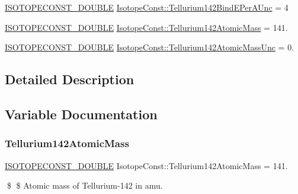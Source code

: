 \begin{DoxyCompactItemize}
\mbox{\hyperlink{group___isotope_const-_macros_ga8f45a7272ce02c0b4c65c44636ed719a}{I\+S\+O\+T\+O\+P\+E\+C\+O\+N\+S\+T\+\_\+\+D\+O\+U\+B\+LE}} \mbox{\hyperlink{group___isotope_const-_tellurium-_te142_ga7dc6b8a4dc039143e81bc5b7ece02100}{Isotope\+Const\+::\+Tellurium142\+Bind\+E\+Per\+A\+Unc}} = 4
\item 
\mbox{\hyperlink{group___isotope_const-_macros_ga8f45a7272ce02c0b4c65c44636ed719a}{I\+S\+O\+T\+O\+P\+E\+C\+O\+N\+S\+T\+\_\+\+D\+O\+U\+B\+LE}} \mbox{\hyperlink{group___isotope_const-_tellurium-_te142_gacf8e739105b6c87a92651ec634b64623}{Isotope\+Const\+::\+Tellurium142\+Atomic\+Mass}} = 141.
\item 
\mbox{\hyperlink{group___isotope_const-_macros_ga8f45a7272ce02c0b4c65c44636ed719a}{I\+S\+O\+T\+O\+P\+E\+C\+O\+N\+S\+T\+\_\+\+D\+O\+U\+B\+LE}} \mbox{\hyperlink{group___isotope_const-_tellurium-_te142_gaa2918a37adb684ac71efa4787174badf}{Isotope\+Const\+::\+Tellurium142\+Atomic\+Mass\+Unc}} = 0.
\end{DoxyCompactItemize}


\subsection{Detailed Description}


\subsection{Variable Documentation}
\mbox{\label{group___isotope_const-_tellurium-_te142_gacf8e739105b6c87a92651ec634b64623}} 
\subsubsection{\texorpdfstring{Tellurium142\+Atomic\+Mass}{Tellurium142AtomicMass}}
{\footnotesize\ttfamily \mbox{\hyperlink{group___isotope_const-_macros_ga8f45a7272ce02c0b4c65c44636ed719a}{I\+S\+O\+T\+O\+P\+E\+C\+O\+N\+S\+T\+\_\+\+D\+O\+U\+B\+LE}} Isotope\+Const\+::\+Tellurium142\+Atomic\+Mass = 141.}

\$ \$ Atomic mass of Tellurium-\/142 in amu. \mbox{\label{group___isotope_const-_tellurium-_te142_gaa2918a37adb684ac71efa4787174badf}} 
